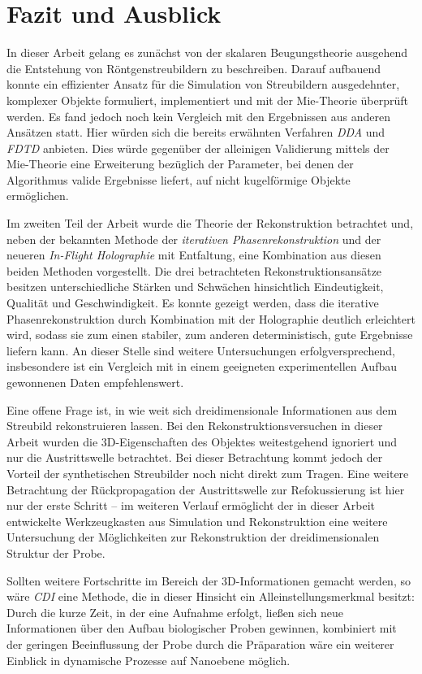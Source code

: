 \chapter{Fazit und Ausblick}
In dieser Arbeit gelang es zunächst von der skalaren Beugungstheorie ausgehend die Entstehung von Röntgenstreubildern zu beschreiben. Darauf aufbauend konnte ein effizienter Ansatz für die Simulation von Streubildern ausgedehnter, komplexer Objekte formuliert, implementiert und mit der Mie-Theorie überprüft werden. Es fand jedoch noch kein Vergleich mit den Ergebnissen aus anderen Ansätzen statt. Hier würden sich die bereits erwähnten Verfahren \textit{DDA} und \textit{FDTD} anbieten. Dies würde gegenüber der alleinigen Validierung mittels der Mie-Theorie eine Erweiterung bezüglich der Parameter, bei denen der Algorithmus valide Ergebnisse liefert, auf nicht kugelförmige Objekte ermöglichen. 

Im zweiten Teil der Arbeit wurde die Theorie der Rekonstruktion betrachtet und, neben der bekannten Methode der \textit{iterativen Phasenrekonstruktion} und der neueren \textit{In-Flight Holographie} mit Entfaltung, eine Kombination aus diesen beiden Methoden vorgestellt. Die drei betrachteten Rekonstruktionsansätze besitzen unterschiedliche Stärken und Schwächen hinsichtlich Eindeutigkeit, Qualität und Geschwindigkeit. Es konnte gezeigt werden, dass die iterative Phasenrekonstruktion durch Kombination mit der Holographie deutlich erleichtert wird, sodass sie zum einen stabiler, zum anderen deterministisch, gute Ergebnisse liefern kann. An dieser Stelle sind weitere Untersuchungen erfolgversprechend, insbesondere ist ein Vergleich mit in einem geeigneten experimentellen Aufbau gewonnenen Daten empfehlenswert.

Eine offene Frage ist, in wie weit sich dreidimensionale Informationen aus dem Streubild rekonstruieren lassen. Bei den Rekonstruktionsversuchen in dieser Arbeit wurden die 3D-Eigenschaften des Objektes weitestgehend ignoriert und nur die Austrittswelle betrachtet. Bei dieser Betrachtung kommt jedoch der Vorteil der synthetischen Streubilder noch nicht direkt zum Tragen. Eine weitere Betrachtung der Rückpropagation der Austrittswelle zur Refokussierung ist hier nur der erste Schritt -- im weiteren Verlauf ermöglicht der in dieser Arbeit entwickelte Werkzeugkasten aus Simulation und Rekonstruktion eine weitere Untersuchung der Möglichkeiten zur Rekonstruktion der dreidimensionalen Struktur der Probe. 

Sollten weitere Fortschritte im Bereich der 3D-Informationen gemacht werden, so wäre \textit{CDI} eine Methode, die in dieser Hinsicht ein Alleinstellungsmerkmal besitzt: Durch die kurze Zeit, in der eine Aufnahme erfolgt, ließen sich neue Informationen über den Aufbau biologischer Proben gewinnen, kombiniert mit der geringen Beeinflussung der Probe durch die Präparation wäre ein weiterer Einblick in dynamische Prozesse auf Nanoebene möglich. 